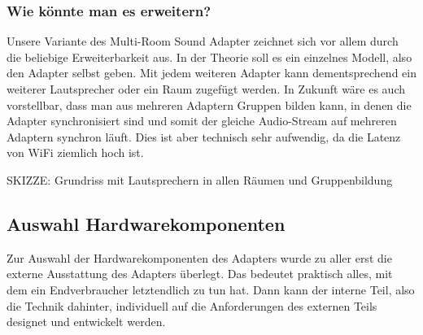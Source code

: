 \documentclass[11pt, twoside]{article}
\begin{document}
\subsubsection{Wie könnte man es erweitern?}
Unsere Variante des Multi-Room Sound Adapter zeichnet sich vor allem durch die beliebige Erweiterbarkeit aus. In der Theorie soll es ein einzelnes Modell, also den Adapter selbst geben. Mit jedem weiteren Adapter kann dementsprechend ein weiterer Lautsprecher oder ein Raum zugefügt werden. In Zukunft wäre es auch vorstellbar, dass man aus mehreren Adaptern Gruppen bilden kann, in denen die Adapter synchronisiert sind und somit der gleiche Audio-Stream auf mehreren Adaptern synchron läuft. Dies ist aber technisch sehr aufwendig, da die Latenz von WiFi ziemlich hoch ist.\newline

SKIZZE: Grundriss mit Lautsprechern in allen Räumen und Gruppenbildung
\subsection{Auswahl Hardwarekomponenten}
Zur Auswahl der Hardwarekomponenten des Adapters wurde zu aller erst die externe Ausstattung des Adapters überlegt. Das bedeutet praktisch alles, mit dem ein Endverbraucher letztendlich zu tun hat. Dann kann der interne Teil, also die Technik dahinter, individuell auf die Anforderungen des externen Teils designet und entwickelt werden.
\end{document}

